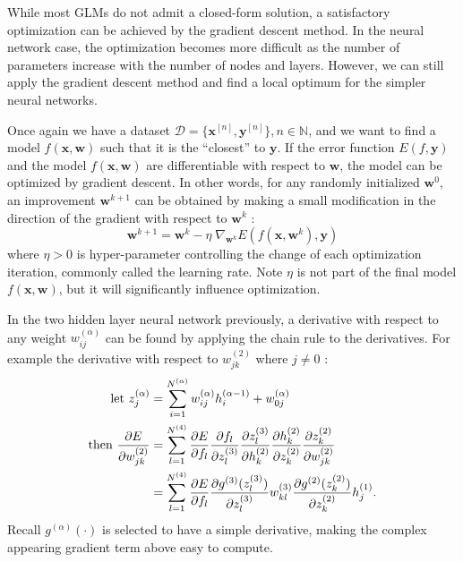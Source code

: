 
While most GLMs do not admit a closed-form solution,
a satisfactory optimization can be achieved by the gradient descent method.
In the neural network case,
the optimization becomes more difficult as
the number of parameters increase with the number of nodes and layers.
However, we can still apply the gradient descent method
and find a local optimum for the simpler neural networks. \cite{Bi07}

Once again we have a dataset $\mathcal{D} = \{\mathbf{x}^{[n]}, 
\mathbf{y}^{[n]}\}, n \in \mathbb{N}$,
and we want to find a model $f(\mathbf{x},\mathbf{w})$ such that 
it is the ``closest'' to $\mathbf{y}$.
If the error function $E(f,\mathbf{y})$
and the model $f(\mathbf{x},\mathbf{w})$ are differentiable
with respect to $\mathbf{w}$,
the model can be optimized by gradient descent.
In other words, for any randomly initialized $\mathbf{w}^0$,
an improvement $\mathbf{w}^{k+1}$ can be obtained by making a 
small modification
in the direction of the gradient with respect to $\mathbf{w}^k$ :
%
\begin{equation}
	\mathbf{w}^{k+1} = \mathbf{w}^{k} - \eta \; \nabla_{\mathbf{w}^k} 
					E\left(f(\mathbf{x},\mathbf{w}^k),\mathbf{y}\right)
\end{equation}
%
where $\eta > 0$ is hyper-parameter controlling the change of 
each optimization iteration, commonly called the learning rate.
Note $\eta$ is not part of the final model $f(\mathbf{x},\mathbf{w})$,
but it will significantly influence optimization.

In the two hidden layer neural network previously,
a derivative with respect to any weight 
$w_{ij}^{(\alpha)}$ can be found
by applying the chain rule to the derivatives.
For example the derivative with respect to $w_{jk}^{(2)}$ 
where $j \neq 0$ :
%
\begin{equation}
\begin{aligned}
	\text{let } z_j^{(\alpha)} &= 
		\sum_{i=1}^{N^{(\alpha)}} w_{ij}^{(\alpha)} h_i^{(\alpha-1)}
      + w_{0j}^{(\alpha)} \\
	\text{then } \frac{\partial E}{\partial w_{jk}^{(2)}} &= 
		\sum_{l=1}^{N^{(4)}} \frac{\partial E}{\partial f_l}
		\frac{\partial f_l}{\partial z_l^{(3)}}
		\frac{\partial z_l^{(3)}}{\partial h_k^{(2)}}
		\frac{\partial h_k^{(2)}}{\partial z_k^{(2)}}
		\frac{\partial z_k^{(2)}}{\partial w_{jk}^{(2)}} \\
	&=
		\sum_{l=1}^{N^{(4)}} \frac{\partial E}{\partial f_l}
		\frac{\partial g^{(3)}(z_l^{(3)}) } {\partial z_l^{(3)}}
		w_{kl}^{(3)}
		\frac{\partial g^{(2)}(z_k^{(2)}) } {\partial z_k^{(2)}}
		h_j^{(1)} .
\end{aligned}
\end{equation}
%
Recall $g^{(\alpha)}(\cdot)$ is selected to have a simple derivative,
making the complex appearing gradient term above easy to compute.

